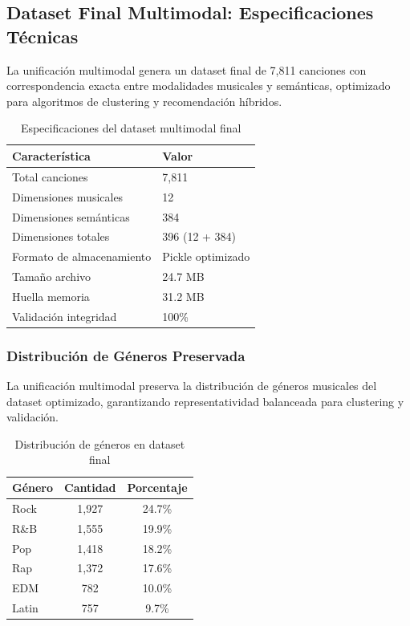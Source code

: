 \documentclass[12pt,a4paper]{report}
\begin{document}
\subsection{Dataset Final Multimodal: Especificaciones Técnicas}

La unificación multimodal genera un dataset final de 7,811 canciones con correspondencia exacta entre modalidades musicales y semánticas, optimizado para algoritmos de clustering y recomendación híbridos.

\begin{table}[h]
\centering
\caption{Especificaciones del dataset multimodal final}
\begin{tabular}{@{}ll@{}}
\toprule
\textbf{Característica} & \textbf{Valor} \\
\midrule
Total canciones & 7,811 \\
Dimensiones musicales & 12 \\
Dimensiones semánticas & 384 \\
Dimensiones totales & 396 (12 + 384) \\
Formato de almacenamiento & Pickle optimizado \\
Tamaño archivo & 24.7 MB \\
Huella memoria & 31.2 MB \\
Validación integridad & 100\% \\
\bottomrule
\end{tabular}
\end{table}

\subsubsection{Distribución de Géneros Preservada}

La unificación multimodal preserva la distribución de géneros musicales del dataset optimizado, garantizando representatividad balanceada para clustering y validación.

\begin{table}[h]
\centering
\caption{Distribución de géneros en dataset final}
\begin{tabular}{@{}lcc@{}}
\toprule
\textbf{Género} & \textbf{Cantidad} & \textbf{Porcentaje} \\
\midrule
Rock & 1,927 & 24.7\% \\
R\&B & 1,555 & 19.9\% \\
Pop & 1,418 & 18.2\% \\
Rap & 1,372 & 17.6\% \\
EDM & 782 & 10.0\% \\
Latin & 757 & 9.7\% \\
\bottomrule
\end{tabular}
\end{table}
\end{document}
